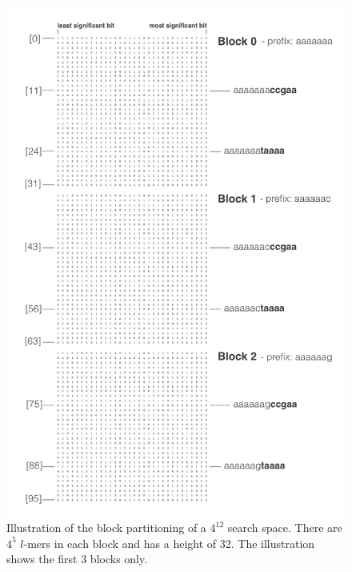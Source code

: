 \begin{figure}[h]
	\centering
	\label{fig:block_search_space}
	\includegraphics[width=4.5in]{contents/00_images/block_search_space}\vspace*{5pt}
	\caption{Illustration of the block partitioning of a $4^{12}$ search space. There are $4^{5}$ $l$-mers in each block and has a height of 32. The illustration shows the first 3 blocks only.}
\end{figure}
